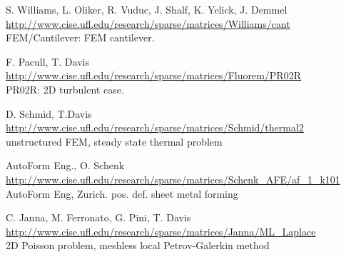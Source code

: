 	{
		{
			S. Williams, L. Oliker, R. Vuduc, J. Shalf, K. Yelick, J. Demmel 
		}
		{
			\url{http://www.cise.ufl.edu/research/sparse/matrices/Williams/cant} \\
			FEM/Cantilever: FEM cantilever.
		}
	}

	{
		{
			F. Pacull, T. Davis
		}
		{
			\url{http://www.cise.ufl.edu/research/sparse/matrices/Fluorem/PR02R} \\
			PR02R: 2D turbulent case.
		}
	}

	{
		{
			D. Schmid, T.Davis
		}
		{
			\url{http://www.cise.ufl.edu/research/sparse/matrices/Schmid/thermal2} \\
			unstructured FEM, steady state thermal problem
		}
	}

	{
		{
			AutoForm Eng., O. Schenk 
		}
		{
			\url{http://www.cise.ufl.edu/research/sparse/matrices/Schenk_AFE/af_1_k101} \\
			AutoForm Eng, Zurich. pos. def. sheet metal forming
		}
	} 
	
	{
		{
			C. Janna, M. Ferronato, G. Pini,  T. Davis
		}
		{
			\url{http://www.cise.ufl.edu/research/sparse/matrices/Janna/ML_Laplace} \\
			2D Poisson problem, meshless local Petrov-Galerkin method
		}
	} 

